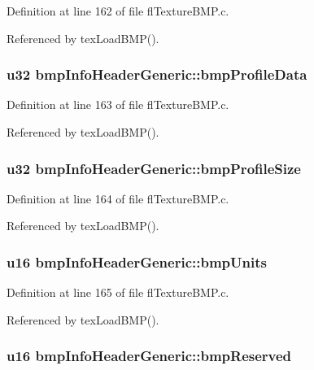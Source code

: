 Definition at line 162 of file fl\-Texture\-BMP.c.

Referenced by tex\-Load\-BMP().
\subsubsection{\setlength{\rightskip}{0pt plus 5cm}u32 {\bf bmp\-Info\-Header\-Generic::bmp\-Profile\-Data}}\label{structbmpInfoHeaderGeneric_ddf763724883c980d35750683ed23155}




Definition at line 163 of file fl\-Texture\-BMP.c.

Referenced by tex\-Load\-BMP().
\subsubsection{\setlength{\rightskip}{0pt plus 5cm}u32 {\bf bmp\-Info\-Header\-Generic::bmp\-Profile\-Size}}\label{structbmpInfoHeaderGeneric_3771f1e2f3613b50387207f4cdb8dd37}




Definition at line 164 of file fl\-Texture\-BMP.c.

Referenced by tex\-Load\-BMP().
\subsubsection{\setlength{\rightskip}{0pt plus 5cm}u16 {\bf bmp\-Info\-Header\-Generic::bmp\-Units}}\label{structbmpInfoHeaderGeneric_7280244fe8b67b6d557f32f3e429eb08}




Definition at line 165 of file fl\-Texture\-BMP.c.

Referenced by tex\-Load\-BMP().
\subsubsection{\setlength{\rightskip}{0pt plus 5cm}u16 {\bf bmp\-Info\-Header\-Generic::bmp\-Reserved}}\label{structbmpInfoHeaderGeneric_2b4715d4fda547faaa7b02ba7a36ec5e}




